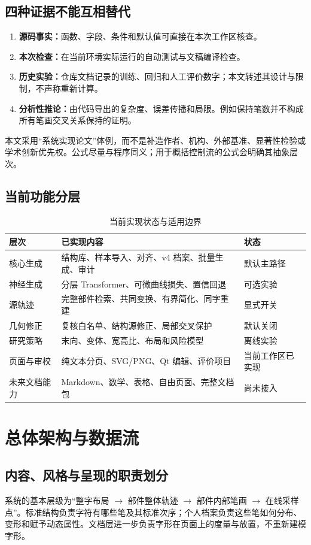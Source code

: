 \documentclass[UTF8,a4paper,11pt,fontset=fandol]{ctexart}
\begin{document}
\subsection{四种证据不能互相替代}
\begin{enumerate}
\item \textbf{源码事实：}函数、字段、条件和默认值可直接在本次工作区核查。
\item \textbf{本次检查：}在当前环境实际运行的自动测试与文稿编译检查。
\item \textbf{历史实验：}仓库文档记录的训练、回归和人工评价数字；本文转述其设计与限制，不声称重新计算。
\item \textbf{分析性推论：}由代码导出的复杂度、误差传播和局限。例如保持笔数并不构成所有笔画交叉关系保持的证明。
\end{enumerate}
本文采用“系统实现论文”体例，而不是补造作者、机构、外部基准、显著性检验或学术创新优先权。公式尽量与程序同义；用于概括控制流的公式会明确其抽象层次。

\subsection{当前功能分层}
\begin{table}[H]\centering\small
\caption{当前实现状态与适用边界}
\begin{tabularx}{\textwidth}{L{31mm}XL{30mm}}
\toprule
层次 & 已实现内容 & 状态\\\midrule
核心生成 & 结构库、样本导入、对齐、v4 档案、批量生成、审计 & 默认主路径\\
神经生成 & 分层 Transformer、可微曲线损失、置信回退 & 可选实验\\
源轨迹 & 完整部件检索、共同变换、有界简化、同字重建 & 显式开关\\
几何修正 & 复核白名单、结构源修正、局部交叉保护 & 默认关闭\\
研究策略 & 末向、变体、宽高比、布局和风险模型 & 离线实验\\
页面与审校 & 纯文本分页、SVG/PNG、Qt 编辑、评价项目 & 当前工作区已实现\\
未来文档能力 & Markdown、数学、表格、自由页面、完整文档包 & 尚未接入\\
\bottomrule
\end{tabularx}
\end{table}

\section{总体架构与数据流}
\subsection{内容、风格与呈现的职责划分}
系统的基本层级为“整字布局 $\rightarrow$ 部件整体轨迹 $\rightarrow$ 部件内部笔画 $\rightarrow$ 在线采样点”。标准结构负责字符有哪些笔及其标准次序；个人档案负责这些笔如何分布、变形和赋予动态属性。文档层进一步负责字形在页面上的度量与放置，不重新建模字形。
\end{document}
